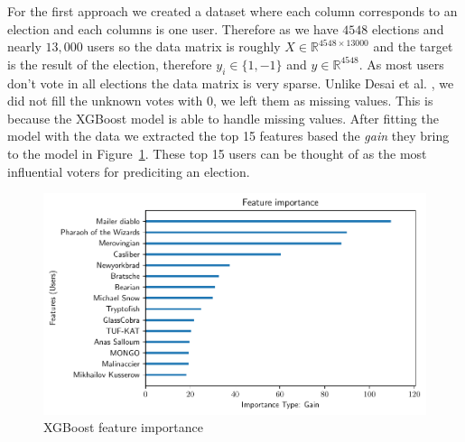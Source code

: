 For the first approach we created a dataset where each column corresponds to an election and each columns is one user. Therefore as we have $4548$ elections and nearly $13,000$ users so the data matrix is roughly $X\in \mathbb{R}^{4548\times 13000}$ and the target is the result of the election, therefore $y_i\in \{1,-1\}$ and $y\in \mathbb{R}^{4548}$. As most users don't vote in all elections the data matrix is very sparse. Unlike Desai et al. \cite{desai2014result}, we did not fill the unknown votes with 0, we left them as missing values. This is because the XGBoost model is able to handle missing values. After fitting the model with the data we extracted the top 15 features based the \textit{gain} they bring to the model in Figure~\ref{fig:xgboost-feat-importance}. These top 15 users can be thought of as the most influential voters for prediciting an election.
\begin{figure}[!ht]
    \centering
    \includegraphics[width=\linewidth]{images/xgboost_features.pdf}
    \caption{XGBoost feature importance}
    \label{fig:xgboost-feat-importance}
\end{figure}

